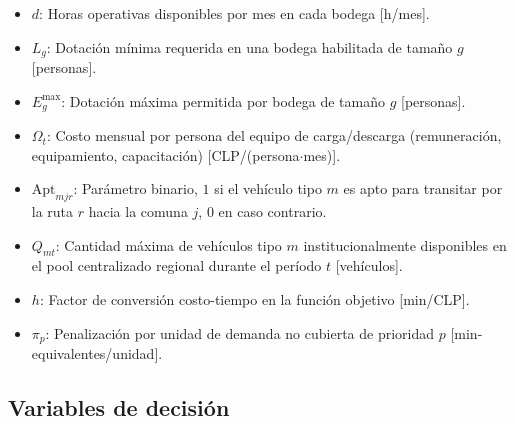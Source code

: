 \documentclass[letterpaper]{article}
\begin{document}
\begin{flushleft}
\begin{itemize}[leftmargin=2em, itemsep=1pt]
  \item $d$: Horas operativas disponibles por mes en cada bodega [h/mes].
  \item $L_g$: Dotaci\'on m\'inima requerida en una bodega habilitada de tama\~no $g$ [personas].
  \item $E^{\max}_g$: Dotaci\'on m\'axima permitida por bodega de tama\~no $g$ [personas].
  \item $\Omega_t$: Costo mensual por persona del equipo de carga/descarga (remuneraci\'on, equipamiento, capacitaci\'on) [CLP/(persona$\cdot$mes)].
  \item $\mathrm{Apt}_{mjr}$: Par\'ametro binario, $1$ si el veh\'iculo tipo $m$ es apto para transitar por la ruta $r$ hacia la comuna $j$, $0$ en caso contrario.
  \item $Q_{mt}$: Cantidad m\'axima de veh\'iculos tipo $m$ institucionalmente disponibles en el pool centralizado regional durante el per\'iodo $t$ [veh\'iculos].
  \item $h$: Factor de conversi\'on costo-tiempo en la funci\'on objetivo [min/CLP].
  \item $\pi_p$: Penalizaci\'on por unidad de demanda no cubierta de prioridad $p$ [min-equivalentes/unidad].
\end{itemize}

\subsection{Variables de decisi\'on}


\end{flushleft}
\end{document}
